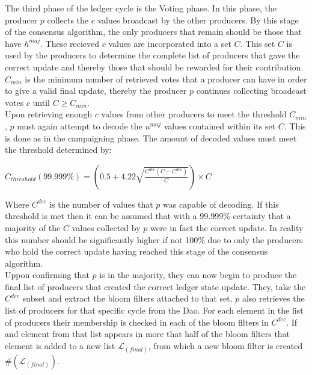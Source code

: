 The third phase of the ledger cycle is the Voting phase. In this phase, the producer $p$ collects the $c$ values broadcast by the other producers. By this stage of the consensus algorithm, the only producers that remain should be those that have $h^{maj}$. These recieved $c$ values are incorporated into a set $C$. This set $C$ is used by the producers to determine the complete list of producers that gave the correct update and thereby those that should be rewarded for their contribution. $C_{min}$ is the minimum number of retrieved votes that a producer can have in order to give a valid final update, thereby the producer $p$ continues collecting broadcast votes $c$ until $C \geq C_{min}$. \\


Upon retrieving enough $c$ values from other producers to meet the threshold $C_{min}$, $p$ must again attempt to decode the $u^{maj}$ values contained within its set $C$. This is done as in the campaigning phase. The amount of decoded values must meet the threshold determined by:  

\begin{center} 
$C_{threshold}(99.999\%) = \left( 0.5 + 4.22\sqrt{\frac{C^{dec}(C-C^{dec})}{C}}\right) \times C$
\end{center} 

Where $C^{dec}$ is the number of values that $p$ was capable of decoding. If this threshold is met then it can be assumed that with a 99.999\% certainty that a majority of the $C$ values collected by $p$ were in fact the correct update. In reality this number should be significantly higher if not 100\% due to only the producers who hold the correct update having reached this stage of the consensus algorithm. \\

Uppon confirming that $p$ is in the majority, they can now begin to produce the final list of producers that created the correct ledger state update. They, take the $C^{dec}$ subset and extract the bloom filters attached to that set. $p$ also retrieves the list of producers for that specific cycle from the Dao. For each element in the list of producers their membership is checked in each of the bloom filters in $C^{dec}$. If and element from that list appears in more that half of the bloom filters that element is added to a new list $\mathcal{L}_{(final)}$, from which a new bloom filter is created $\#(\mathcal{L}_{(final)})$.




